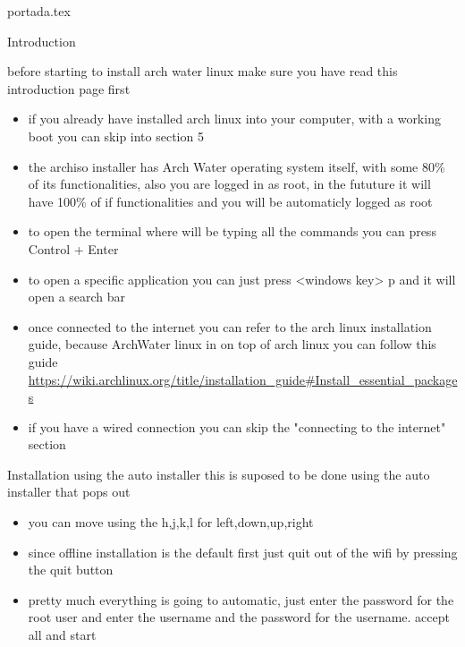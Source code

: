 
{portada.tex}
\newpage
\tableofcontents
\printindex
\newpage
\begin{section}{Introduction}
	\begin{center}
		\begin{Large}
			before starting to install arch water linux make sure you have read this introduction page first
		\end{Large}
	\end{center}
	\begin{itemize}
		\item 
			if you already have installed arch linux into your computer, with a working boot you can skip into section 5
		\item
			the archiso installer has Arch Water operating system itself, with some 80\% of its functionalities, 
			also you are logged in as root, in the fututure it will have 100\% of if functionalities and you will be automaticly logged as root
		\item
			to open the terminal where will be typing all the commands you can press Control + Enter
		\item 
			to open a specific application you can just press <windows key> p and it will open a search bar
		\item
			once connected to the internet you can refer to the arch linux installation guide, because ArchWater linux in on top of arch linux you can follow this guide
			\url{https://wiki.archlinux.org/title/installation_guide#Install_essential_packages}
		\item 
			if you have a wired connection you can skip the "connecting to the internet" section
	\end{itemize}
\end{section}
\newpage
\begin{section}{Installation using the auto installer}
	this is suposed to be done using the auto installer that pops out
	\begin{itemize}
		\item
			you can move using the h,j,k,l for left,down,up,right
		\item
			since offline installation is the default first just quit out of the wifi by pressing the quit button
		\item
			pretty much everything is going to automatic, just enter the password for the root user and
			enter the username and the password for the username. accept all and start
	\end{itemize}
\end{section}
